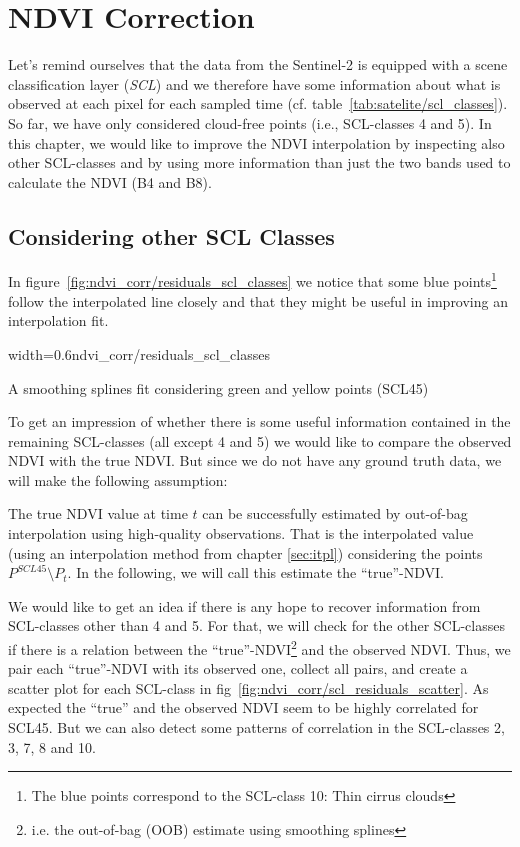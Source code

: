 \chapter{NDVI Correction}

{
    Let's remind ourselves that the data from the Sentinel-2 is equipped with a scene classification layer (\textit{SCL}) and we therefore have some information about what is observed at each pixel for each sampled time (cf. table~\ref{tab:satelite/scl_classes}). So far, we have only considered cloud-free points (i.e., SCL-classes 4 and 5). In this chapter, we would like to improve the NDVI interpolation by inspecting also other SCL-classes and by using more information than just the two bands used to calculate the NDVI (B4 and B8).
}

\section{Considering other SCL Classes}{
    In figure~\ref{fig:ndvi_corr/residuals_scl_classes} we notice that some blue points\footnote{The blue points correspond to the SCL-class 10: Thin cirrus clouds} follow the interpolated line closely and that they might be useful in improving an interpolation fit.

    \begin{my_figure}[ht]{width=0.6\textwidth}{ndvi_corr/residuals_scl_classes}
        \caption{A smoothing splines fit considering green and yellow points (SCL45)}
        \label{fig:ndvi_corr/residuals_scl_classes}
    \end{my_figure}

    To get an impression of whether there is some useful information contained in the remaining SCL-classes (all except 4 and 5) we would like to compare the observed NDVI with the true NDVI. But since we do not have any ground truth data, we will make the following assumption:

    \begin{assumption}{1}%
        \label{true_ndvi_assumption}
        The true NDVI value at time $t$ can be successfully estimated by out-of-bag interpolation using high-quality observations. That is the interpolated value (using an interpolation method from chapter \ref{sec:itpl}) considering the points $P^{SCL45}\setminus P_t$. In the following, we will call this estimate the ``true''-NDVI.
    \end{assumption}

    We would like to get an idea if there is any hope to recover information from SCL-classes other than 4 and 5. For that, we will check for the other SCL-classes if there is a relation between the ``true''-NDVI\footnote{\label{footnote:truendvi} i.e. the out-of-bag (OOB) estimate using smoothing splines} and the observed NDVI. Thus, we pair each ``true''-NDVI with its observed one, collect all pairs, and create a scatter plot for each SCL-class in fig~\ref{fig:ndvi_corr/scl_residuals_scatter}.
    As expected the ``true'' and the observed NDVI seem to be highly correlated for SCL45. But we can also detect some patterns of correlation in the SCL-classes 2, 3, 7, 8 and 10.  

}
